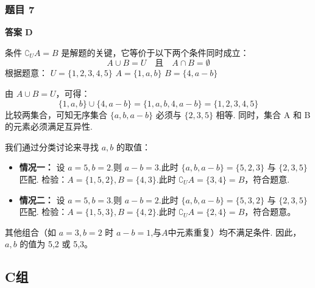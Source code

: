 \subsubsection*{题目 7}
\begin{solution}
	\textbf{答案 D}
	
	条件 $\complement_U A = B$ 是解题的关键，它等价于以下两个条件同时成立：
	\[ A \cup B = U \quad \text{且} \quad A \cap B = \emptyset \]
	根据题意：
	$U=\{1,2,3,4,5\}$
	$A=\{1,a,b\}$
	$B=\{4, a-b\}$
	
	由 $A \cup B = U$，可得：
	\[ \{1,a,b\} \cup \{4, a-b\} = \{1, a, b, 4, a-b\} = \{1,2,3,4,5\} \]
	比较两集合，可知无序集合 $\{a, b, a-b\}$ 必须与 $\{2,3,5\}$ 相等.
	同时，集合 A 和 B 的元素必须满足互异性.
	
	我们通过分类讨论来寻找 $a,b$ 的取值：
	\begin{itemize}
		\item \textbf{情况一：} 设 $a=5, b=2$.则 $a-b = 3$.此时 $\{a,b,a-b\} = \{5,2,3\}$ 与 $\{2,3,5\}$ 匹配.
		检验：$A=\{1,5,2\}, B=\{4,3\}$.此时 $\complement_U A = \{3,4\}=B$，符合题意.
		\item \textbf{情况二：} 设 $a=5, b=3$.则 $a-b = 2$.此时 $\{a,b,a-b\} = \{5,3,2\}$ 与 $\{2,3,5\}$ 匹配.
		检验：$A=\{1,5,3\}, B=\{4,2\}$.此时 $\complement_U A = \{2,4\}=B$，符合题意。
	\end{itemize}
	其他组合（如 $a=3,b=2$ 时 $a-b=1$,与$A$中元素重复）均不满足条件.
	因此，$a,b$ 的值为 5,2 或 5,3。
\end{solution}

\subsection*{C组}

